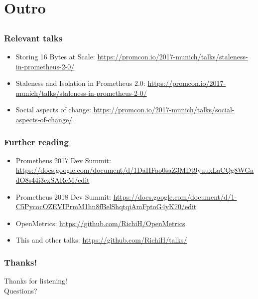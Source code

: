 \documentclass[t]{beamer}
\begin{document}
\section{Outro}


\subsection{}

\begin{frame}
	\frametitle{Relevant talks}
	\begin{itemize}
		\item Storing 16 Bytes at Scale: \url{https://promcon.io/2017-munich/talks/staleness-in-prometheus-2-0/}
		\item Staleness and Isolation in Prometheus 2.0: \url{https://promcon.io/2017-munich/talks/staleness-in-prometheus-2-0/}
		\item Social aspects of change: \url{https://promcon.io/2017-munich/talks/social-aspects-of-change/}
	\end{itemize}
\end{frame}


\begin{frame}
	\frametitle{Further reading}
	\begin{itemize}
		\item Prometheus 2017 Dev Summit: \url{https://docs.google.com/document/d/1DaHFao0saZ3MDt9yuuxLaCQg8WGadO8s44i3cxSARcM/edit}
		\item Prometheus 2018 Dev Summit: \url{https://docs.google.com/document/d/1-C5PycocOZEVIPrmM1hn8fBelShqtqiAmFptoG4yK70/edit}
		\item OpenMetrics: \url{https://github.com/RichiH/OpenMetrics}
		\item This and other talks: \url{https://github.com/RichiH/talks/}
	\end{itemize}
\end{frame}

\begin{frame}
	\frametitle{Thanks!}
		\begin{center}
			\vfill
			Thanks for listening!\\
			\vfill
			Questions?
			\vfill
		\end{center}
\end{frame}
\end{document}

